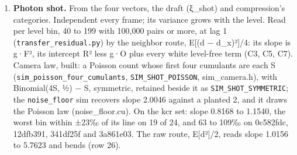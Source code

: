 \begin{enumerate}
\item \textbf{Photon shot.} From the four vectors, the draft (ξ\_\allowbreak{}shot) and compression's categories. Independent every frame; its variance grows with the level. Read per level bin, 40 to 199 with 100,000 pairs or more, at lag 1 (\texttt{transfer\_\allowbreak{}residual.\allowbreak{}py}) by the neighbor route, E[(d − d\_\allowbreak{}x)²]/4: its slope is g·F², its intercept R² less g·O plus every white level-free term (C3, C5, C7). Camera law, built: a Poisson count whose first four cumulants are each S (\texttt{sim\_\allowbreak{}poisson\_\allowbreak{}four\_\allowbreak{}cumulants}, \texttt{SIM\_\allowbreak{}SHOT\_\allowbreak{}POISSON}, sim\_\allowbreak{}camera.h), with Binomial(4S, ½) − S, symmetric, retained beside it as \texttt{SIM\_\allowbreak{}SHOT\_\allowbreak{}SYMMETRIC}; the \texttt{noise\_\allowbreak{}floor} sim recovers slope 2.0046 against a planted 2, and it draws the Poisson law (noise\_\allowbreak{}floor.cu). On the kcr set: slope 0.8168 to 1.1540, the worst bin within ±23‰ of its line on 19 of 24, and 63 to 109‰ on 0c582fdc, 12dfb391, 341df25f and 3a861e03. The raw route, E[d²]/2, reads slope 1.0156 to 5.7623 and bends (row 26).


\end{enumerate}
